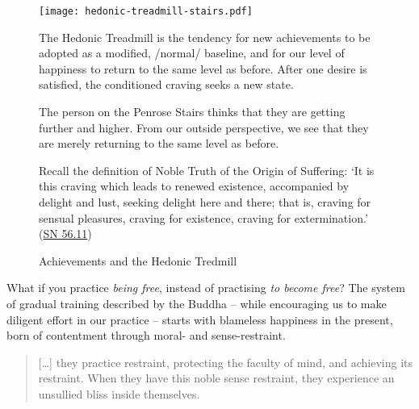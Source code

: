 \begin{figure}[h]
\caption{Achievements and the Hedonic Tredmill}\label{fig-hedonic-treadmill}

\centering

\texttt{[image: hedonic-treadmill-stairs.pdf]}

\bigskip

{\small

The Hedonic Treadmill is the tendency for new achievements to be adopted as a modified, /normal/ baseline,
and for our level of happiness to return to the same level as before.
After one desire is satisfied, the conditioned craving seeks a new state.

\bigskip

The person on the Penrose Stairs thinks that
they are getting further and higher.
From our outside perspective,
we see that they are merely returning to the same level as before.

\bigskip

Recall the definition of Noble Truth of the Origin of Suffering:
`It is this craving which leads to renewed existence,
 accompanied by delight and lust, seeking delight here and there;
 that is, craving for sensual pleasures, craving for existence,
 craving for extermination.'
(\href{https://suttacentral.net/sn56.11/en/bodhi}{SN 56.11})

}

\end{figure}

\clearpage

What if you practice \emph{being free}, instead of practising \emph{to
become free}? The system of gradual training described by the Buddha --
while encouraging us to make diligent effort in our practice -- starts
with blameless happiness in the present, born of contentment through
moral- and sense-restraint.

\begin{quote}
{[}\ldots{]} they practice restraint, protecting the faculty of mind,
and achieving its restraint. When they have this noble sense restraint,
they experience an unsullied bliss inside themselves.

\bigskip

\end{quote}


